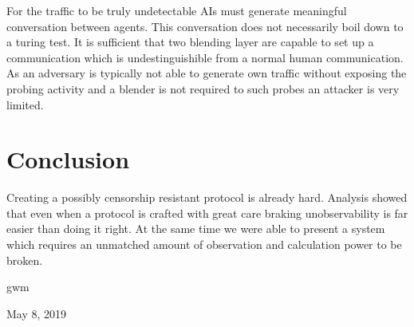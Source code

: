 \documentclass[10pt,journal,compsoc]{IEEEtran}
\let\MYoriglatexcaption\caption
\renewcommand{\caption}[2][\relax]{\MYoriglatexcaption[#2]{#2}}
\begin{document}
For the traffic to be truly undetectable AIs must generate meaningful conversation between agents. This conversation does not necessarily boil down to a turing test. It is sufficient that two blending layer are capable to set up a communication which is undestinguishible from a normal human communication. As an adversary is typically not able to generate own traffic without exposing the probing activity and a blender is not required to such probes an attacker is very limited.

\section{Conclusion}
Creating a possibly censorship resistant protocol is already hard. Analysis showed that even when a protocol is crafted with great care braking unobservability is far easier than doing it right. At the same time we were able to present a system which requires an unmatched amount of observation and calculation power to be broken.

\hfill gwm
 
\hfill May 8, 2019





%
%
\end{document}
